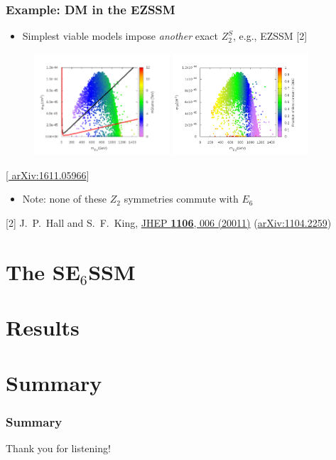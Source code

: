 \documentclass[10pt,aspectratio=169]{beamer}
\begin{document}
\begin{frame}
  \frametitle{Example: DM in the EZSSM}
  \begin{itemize} \itemsep1em
  \item Simplest viable models impose \emph{another} exact $Z_2^S$, e.g.,
    EZSSM [2]
  \end{itemize}
  \vspace*{-10pt}
  \begin{figure}
    \centering
    \hfill
    \includegraphics[width=0.45\textwidth]{ezssm_direct_detection}
    \hfill
    \includegraphics[width=0.45\textwidth]{ezssm_bino_fraction}
    \hfill
  \end{figure}
  \vspace*{-20pt}
  \begin{center}
    { \tiny [\href{http://arxiv.org/abs/1611.05966}{%
          arXiv:1611.05966}] }
  \end{center}
  \begin{itemize} \itemsep1em
  \item \alert{Note: none of these $Z_2$ symmetries commute with $E_6$}
  \end{itemize}
      {\tiny [2] J.~P.~Hall and S.~F.~King,
        \href{http://doi.org/10.1007/JHEP06(2011)006}{JHEP
          \textbf{1106}, 006 (20011)}
        (\href{http://arxiv.org/abs/1104.2259}{arXiv:1104.2259})}
\end{frame}

\section{The SE$_6$SSM}

\section{Results}

\section{Summary}

\begin{frame}
  \frametitle{Summary}
    \begin{center}
    \large Thank you for listening!
  \end{center}
\end{frame}
\end{document}
